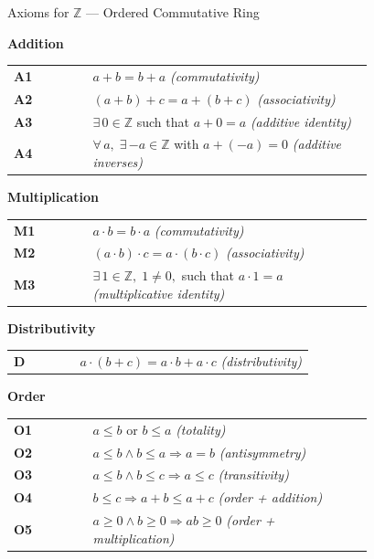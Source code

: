 \begin{axiombox}{Axioms for $\mathbb{Z}$ --- Ordered Commutative Ring}

\medskip
\noindent\textbf{Addition}

\medskip
\begin{tabular}{@{} l p{0.78\linewidth} @{}}
\textbf{A1} & $a + b = b + a$ \hfill\textit{(commutativity)} \\[3pt]
\textbf{A2} & $(a + b) + c = a + (b + c)$ \hfill\textit{(associativity)} \\[3pt]
\textbf{A3} & $\exists\, 0 \in \mathbb{Z}$ such that $a + 0 = a$
             \hfill\textit{(additive identity)} \\[3pt]
\textbf{A4} & $\forall\, a,\; \exists\, {-a} \in \mathbb{Z}$ with
             $a + (-a) = 0$
             \hfill\textit{(additive inverses)} \\[6pt]
\end{tabular}

\noindent\textbf{Multiplication}

\medskip
\begin{tabular}{@{} l p{0.78\linewidth} @{}}
\textbf{M1} & $a \cdot b = b \cdot a$ \hfill\textit{(commutativity)} \\[3pt]
\textbf{M2} & $(a \cdot b) \cdot c = a \cdot (b \cdot c)$
             \hfill\textit{(associativity)} \\[3pt]
\textbf{M3} & $\exists\, 1 \in \mathbb{Z},\; 1 \neq 0,$ such that $a \cdot 1 = a$
             \hfill\textit{(multiplicative identity)} \\[6pt]
\end{tabular}

\noindent\textbf{Distributivity}

\medskip
\begin{tabular}{@{} l p{0.78\linewidth} @{}}
\textbf{D} & $a \cdot (b + c) = a \cdot b + a \cdot c$
            \hfill\textit{(distributivity)} \\[6pt]
\end{tabular}

\noindent\textbf{Order}

\medskip
\begin{tabular}{@{} l p{0.78\linewidth} @{}}
\textbf{O1} & $a \leq b$ or $b \leq a$ \hfill\textit{(totality)} \\[3pt]
\textbf{O2} & $a \leq b \land b \leq a \Rightarrow a = b$
             \hfill\textit{(antisymmetry)} \\[3pt]
\textbf{O3} & $a \leq b \land b \leq c \Rightarrow a \leq c$
             \hfill\textit{(transitivity)} \\[3pt]
\textbf{O4} & $b \leq c \Rightarrow a + b \leq a + c$
             \hfill\textit{(order + addition)} \\[3pt]
\textbf{O5} & $a \geq 0 \land b \geq 0 \Rightarrow ab \geq 0$
             \hfill\textit{(order + multiplication)} \\
\end{tabular}
\end{axiombox}

